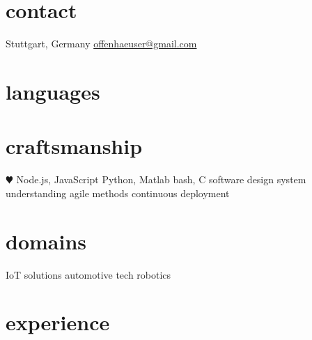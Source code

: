 \documentclass[]{friggeri-cv} %
\begin{document}


\begin{aside} %
\section{\color{red}contact}
Stuttgart, Germany
\href{mailto:offenhaeuser@gmail.com}{offenhaeuser@gmail.com}
\section{\color{purple}languages}
\section{\color{green}craftsmanship}
{\color{red} $\varheartsuit$} Node.js, JavaScript
Python, Matlab
bash, C
software design
system understanding
agile methods
continuous deployment
\section{\color{blue}domains}
IoT solutions
automotive tech
robotics
\end{aside}


\section{\color{orange}experience}
\end{document}
